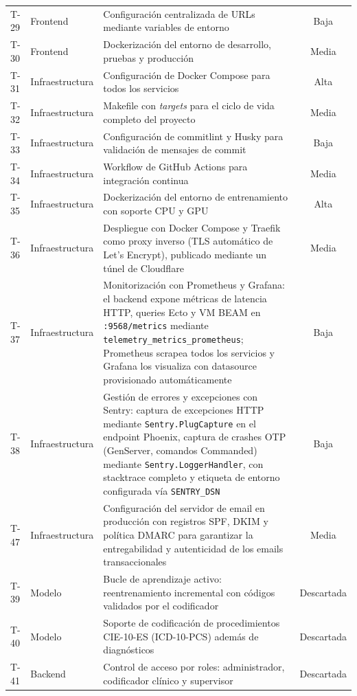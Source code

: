 \begin{center}
\begin{longtable}{llp{7cm}c}
T-29 & Frontend & Configuración centralizada de URLs mediante variables de entorno & Baja \\
T-30 & Frontend & Dockerización del entorno de desarrollo, pruebas y producción & Media \\
\hline
T-31 & Infraestructura & Configuración de Docker Compose para todos los servicios & Alta \\
T-32 & Infraestructura & Makefile con \emph{targets} para el ciclo de vida completo del proyecto & Media \\
T-33 & Infraestructura & Configuración de commitlint y Husky para validación de mensajes de commit & Baja \\
T-34 & Infraestructura & Workflow de GitHub Actions para integración continua & Media \\
T-35 & Infraestructura & Dockerización del entorno de entrenamiento con soporte CPU y GPU & Alta \\
T-36 & Infraestructura & Despliegue con Docker Compose y Traefik como proxy inverso (TLS automático de Let's Encrypt), publicado mediante un túnel de Cloudflare & Media \\
T-37 & Infraestructura & Monitorización con Prometheus y Grafana: el backend expone métricas de latencia HTTP, queries Ecto y VM BEAM en \texttt{:9568/metrics} mediante \texttt{telemetry\_metrics\_prometheus}; Prometheus scrapea todos los servicios y Grafana los visualiza con datasource provisionado automáticamente & Baja \\
T-38 & Infraestructura & Gestión de errores y excepciones con Sentry: captura de excepciones HTTP mediante \texttt{Sentry.PlugCapture} en el endpoint Phoenix, captura de crashes OTP (GenServer, comandos Commanded) mediante \texttt{Sentry.LoggerHandler}, con stacktrace completo y etiqueta de entorno configurada vía \texttt{SENTRY\_DSN} & Baja \\
T-47 & Infraestructura & Configuración del servidor de email en producción con registros SPF, DKIM y política DMARC para garantizar la entregabilidad y autenticidad de los emails transaccionales & Media \\
\hline
T-39 & Modelo & Bucle de aprendizaje activo: reentrenamiento incremental con códigos validados por el codificador & Descartada \\
T-40 & Modelo & Soporte de codificación de procedimientos CIE-10-ES (ICD-10-PCS) además de diagnósticos & Descartada \\
T-41 & Backend & Control de acceso por roles: administrador, codificador clínico y supervisor & Descartada \\

\end{longtable}
\end{center}
